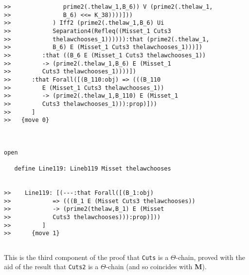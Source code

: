 \documentclass[12pt]{article}
\begin{document}
\begin{verbatim}
>>               prime2(.thelaw_1,B_6)) V (prime2(.thelaw_1,
>>               B_6) <<= K_38))))]))
>>            ) Iff2 (prime2(.thelaw_1,B_6) Ui
>>            Separation4(Refleq((Misset_1 Cuts3
>>            thelawchooses_1)))))):that (prime2(.thelaw_1,
>>            B_6) E (Misset_1 Cuts3 thelawchooses_1)))])
>>         :that ((B_6 E (Misset_1 Cuts3 thelawchooses_1))
>>         -> (prime2(.thelaw_1,B_6) E (Misset_1
>>         Cuts3 thelawchooses_1))))])
>>      :that Forall([(B_110:obj) => (((B_110
>>         E (Misset_1 Cuts3 thelawchooses_1))
>>         -> (prime2(.thelaw_1,B_110) E (Misset_1
>>         Cuts3 thelawchooses_1))):prop)]))
>>      ]
>>   {move 0}



open

   define Line119: Lineb119 Misset thelawchooses


>>    Line119: [(---:that Forall([(B_1:obj)
>>            => (((B_1 E (Misset Cuts3 thelawchooses))
>>            -> (prime2(thelaw,B_1) E (Misset
>>            Cuts3 thelawchooses))):prop)]))
>>         ]
>>      {move 1}


\end{verbatim}

This is the third component of the proof that {\tt Cuts} is a $\Theta$-chain, proved with the aid of the result that {\tt Cuts2} is a $\Theta$-chain (and so coincides with {\bf M}).
\end{document}
